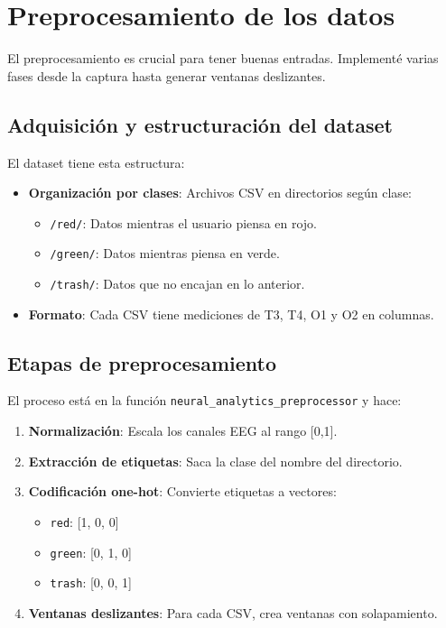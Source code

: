 \section{Preprocesamiento de los datos}

El preprocesamiento es crucial para tener buenas entradas. Implementé varias fases desde la captura hasta generar ventanas deslizantes.

\subsection{Adquisición y estructuración del dataset}

El dataset tiene esta estructura:

\begin{itemize}
    \item \textbf{Organización por clases}: Archivos CSV en directorios según clase:
    \begin{itemize}
        \item \texttt{/red/}: Datos mientras el usuario piensa en rojo.
        \item \texttt{/green/}: Datos mientras piensa en verde.
        \item \texttt{/trash/}: Datos que no encajan en lo anterior.
    \end{itemize}
    
    \item \textbf{Formato}: Cada CSV tiene mediciones de T3, T4, O1 y O2 en columnas.
\end{itemize}

\subsection{Etapas de preprocesamiento}

El proceso está en la función \texttt{neural\_analytics\_preprocessor} y hace:

\begin{enumerate}
    \item \textbf{Normalización}: Escala los canales EEG al rango [0,1].
    
    \item \textbf{Extracción de etiquetas}: Saca la clase del nombre del directorio.
    
    \item \textbf{Codificación one-hot}: Convierte etiquetas a vectores:
    \begin{itemize}
        \item \texttt{red}: [1, 0, 0]
        \item \texttt{green}: [0, 1, 0]
        \item \texttt{trash}: [0, 0, 1]
    \end{itemize}
    
    \item \textbf{Ventanas deslizantes}: Para cada CSV, crea ventanas con solapamiento.
\end{enumerate}

